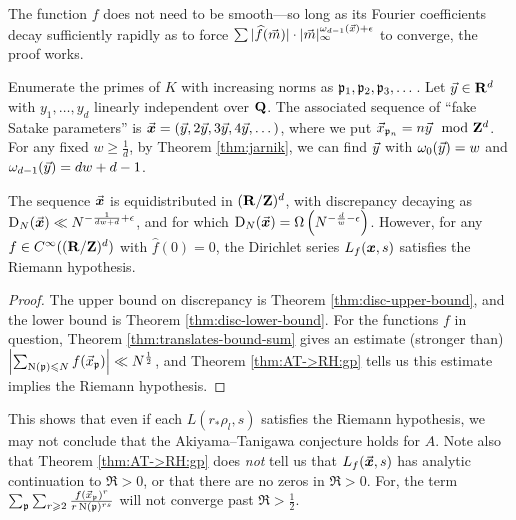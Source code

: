 The function $f$ does not need to be smooth---so long as its Fourier 
coefficients decay sufficiently rapidly as to force 
$\sum |\widehat f(\vec{m})| \cdot |\vec{m}|_\infty^{\omega_{d-1}(\vec{x})+\epsilon}$ to 
converge, the proof works. 

Enumerate the primes of $K$ with increasing norms as $\mathfrak{p}_1,\mathfrak{p}_2,\mathfrak{p}_3,\dots$.  
Let $\vec{y}\in \mathbf{R}^d$ with $y_1,\dots,y_d$ linearly independent over $\mathbf{Q}$. The 
associated sequence of ``fake Satake parameters'' is 
$\vec{\boldsymbol x} = (\vec{y}, 2\vec{y}, 3 \vec{y}, 4 \vec{y}, \dots)$, 
where we put $\vec{x}_{\mathfrak{p}_n} = n \vec{y}\mod {\mathbf{Z}}^d$. For any fixed 
$w\geqslant \frac 1 d$, by Theorem \ref{thm:jarnik}, we can find $\vec{y}$ with 
$\omega_0(\vec{y}) = w$ and $\omega_{d-1}(\vec{y}) = d w + d - 1$. 

\begin{theorem}
The sequence $\vec{\boldsymbol x}$ is equidistributed in $(\mathbf{R}/\mathbf{Z})^d$, with discrepancy 
decaying as $\operatorname{D}_N(\vec{\boldsymbol x}) \ll N^{-\frac{1}{d w+d} + \epsilon}$, and for which 
$\operatorname{D}_N(\vec{\boldsymbol x}) = \Omega\left(N^{-\frac{d}{w} - \epsilon}\right)$. 
However, for any $f\in C^\infty((\mathbf{R}/\mathbf{Z})^d)$ with $\widehat f(0)=0$, the 
Dirichlet series  $L_f({\boldsymbol x},s)$ satisfies the Riemann hypothesis. 
\end{theorem}
\begin{proof}
The upper bound on discrepancy is Theorem \ref{thm:disc-upper-bound}, and 
the lower bound is Theorem \ref{thm:disc-lower-bound}. For the functions $f$ in 
question, Theorem \ref{thm:translates-bound-sum} gives an estimate (stronger 
than) $\left| \sum_{\operatorname{N}(\mathfrak{p})\leqslant N} f(\vec{x}_{\mathfrak{p}})\right|\ll N^{\frac 1 2}$, and 
Theorem \ref{thm:AT->RH:gp} tells us this estimate implies the Riemann 
hypothesis. 
\end{proof}

This shows that even if each $L(r_\ast \rho_l,s)$ satisfies the Riemann 
hypothesis, we may not conclude that the Akiyama--Tanigawa 
conjecture holds for $A$. Note also that Theorem \ref{thm:AT->RH:gp} does 
\emph{not} tell us that $L_f(\vec{\boldsymbol x},s)$ has analytic continuation to $\Re > 0$, or 
that there are no zeros in $\Re > 0$. For, the term 
$\sum_{\mathfrak{p}} \sum_{r\geqslant 2} \frac{f(\vec{x}_{\mathfrak{p}})^r}{r \operatorname{N}(\mathfrak{p})^{r s}}$ will not 
converge past $\Re > \frac 1 2$.
